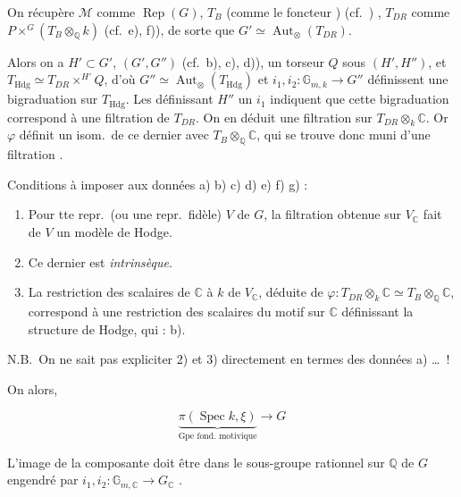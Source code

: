 \documentclass[11pt,a4paper]{article}
\begin{document}
On récupère $\mathcal{M}$ comme \struck{\ill{}} $\operatorname{Rep}(G)$, $T_{B}$
(comme le foncteur \struck{\ill{}}) (cf.\ \ill{}) ,
$T_{DR}$ comme  $P \times^{G} (T_{B} \otimes_{\mathbb{Q}} k)$
(cf.\ e), f)),  de sorte que
$G' \simeq \operatorname{Aut}_{\otimes}(T_{DR})$. \struck{\ill{}}

Alors on a $H' \subset G'$, \ill{} $(G', G'')$ (cf.\ b), c), d)), \struck{\ill{}}
un torseur $Q$ sous $(H', H'')$, \struck{\ill{}} et
$T_{\mathrm{Hdg}} \simeq T_{DR} \times^{H'} Q$, d'où
$G'' \simeq \operatorname{Aut}_{\otimes}(T_{\mathrm{Hdg}})$ et
$i_{1}, i_{2} : \mathbb{G}_{m,k} \to G''$ définissent une bigraduation sur
$T_{\mathrm{Hdg}}$. Les  \ill{} définissant $H''$
\ill{} un  \ill{} $i_{1}$ indiquent que cette bigraduation
correspond à une \struck{\ill{}} filtration de $T_{DR}$. On en déduit une
filtration sur $T_{DR} \otimes_{k} \mathbb{C}$. Or $\varphi$ définit un isom.\
de ce dernier avec $T_{B} \otimes_{\mathbb{Q}} \mathbb{C}$, qui se trouve donc
muni d'une filtration \ill{}.

Conditions à imposer aux données a) b) c) d) e) f) g) :

\begin{enumerate}
  \item[1)] Pour tte repr.\ (ou une repr.\ fidèle) $V$ de $G$, la
  filtration \add{(condition \uncertain{annexe})} obtenue sur $V_{\mathbb{C}}$
  \struck{\ill{}} fait de $V$ un modèle de Hodge.
  \item[2)] Ce dernier est \emph{intrinsèque}.
  \item[3)] La restriction des scalaires de $\mathbb{C}$ à $k$ de
  $V_{\mathbb{C}}$, déduite de
  $\varphi : T_{DR} \otimes_{k} \mathbb{C} \simeq T_{B} \otimes_{\mathbb{Q}} \mathbb{C}$,
  correspond à une restriction des scalaires du motif sur $\mathbb{C}$
  définissant la structure de Hodge, qui \add{\ill{}} : b).
\end{enumerate}

N.B.\ On ne sait pas expliciter 2) et 3) \struck{\ill{}} directement en termes
des données a) \ldots\ !

On  alors, 
\ill{}


\[ \underbrace{\pi(\operatorname{Spec} k, \xi)}_{\text{Gpe fond.\ motivique}} \longrightarrow G \]

L'image \struck{\ill{}} de la composante \ill{} doit être dans le sous-groupe
rationnel sur $\mathbb{Q}$ de $G$ engendré par
$i_{1}, i_{2} : \mathbb{G}_{m,\mathbb{C}} \to G_{\mathbb{C}}$
.
\end{document}
